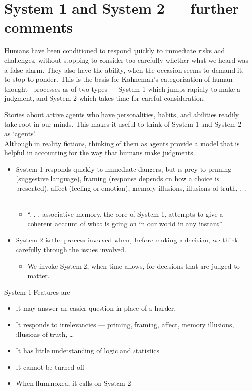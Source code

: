 \documentclass[
  10pt,
  b5paper]{book}
\providecommand{\tightlist}{%
  \setlength{\itemsep}{0pt}\setlength{\parskip}{0pt}}
\begin{document}
\hypertarget{system-1-and-system-2-further-comments}{%
\section{System 1 and System 2 --- further comments}\label{system-1-and-system-2-further-comments}}

Humans have been conditioned to respond quickly to immediate
risks and challenges, without stopping to consider too carefully
whether what we heard was a false alarm. They also have the
ability, when the occasion seems to demand it, to stop to ponder.
This is the basis for Kahneman's categorization of human thought~
processes as of two types --- System 1 which jumps rapidly to
make a judgment, and System 2 which takes time for careful
consideration.

Stories about active agents who have personalities, habits,
and abilities readily take root in our minds. This makes it
useful to think of System 1 and System 2 as `agents'.\\
Although in reality fictions, thinking of them as agents
provide a model that is helpful in accounting for the way that
humans make judgments.

\begin{itemize}
\tightlist
\item
  System 1 responds quickly to immediate dangers, but is prey to
  priming (suggestive language), framing (response depends on how
  a choice is presented), affect (feeling or emotion),
  memory illusions, illusions of truth, . . .

  \begin{itemize}
  \tightlist
  \item
    ``. . . associative memory, the core of System 1, attempts to give a coherent
    account of what is going on in our world in any instant''
  \end{itemize}
\item
  System 2 is the process involved when,~before making a decision,
  we think carefully through the issues involved.

  \begin{itemize}
  \tightlist
  \item
    We invoke System 2, when time allows, for decisions that are judged to matter.
  \end{itemize}
\end{itemize}

System 1 Features are

\begin{itemize}
\tightlist
\item
  It may answer an easier question in place of a harder.
\item
  It responds to irrelevancies --- priming, framing, affect, memory illusions,
  illusions of truth, \ldots{}
\item
  It has little understanding of logic and statistics
\item
  It cannot be turned off
\item
  When flummoxed, it calls on System 2
\end{itemize}
\end{document}
